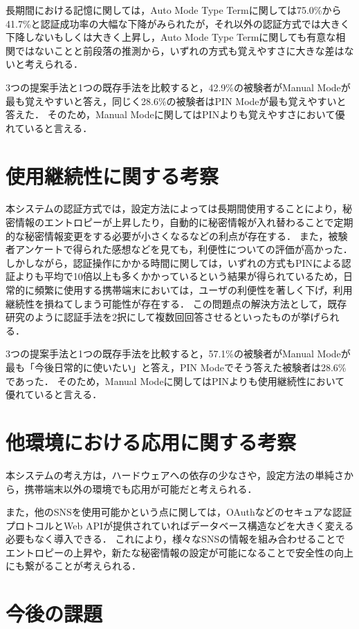 長期間における記憶に関しては，Auto Mode Type Termに関しては75.0\%から41.7\%と認証成功率の大幅な下降がみられたが，それ以外の認証方式では大きく下降しないもしくは大きく上昇し，Auto Mode Type Termに関しても有意な相関ではないことと前段落の推測から，いずれの方式も覚えやすさに大きな差はないと考えられる．

3つの提案手法と1つの既存手法を比較すると，42.9\%の被験者がManual Modeが最も覚えやすいと答え，同じく28.6\%の被験者はPIN Modeが最も覚えやすいと答えた．
そのため，Manual Modeに関してはPINよりも覚えやすさにおいて優れていると言える．

\section{使用継続性に関する考察}\label{sec:continuity}
本システムの認証方式では，設定方法によっては長期間使用することにより，秘密情報のエントロピーが上昇したり，自動的に秘密情報が入れ替わることで定期的な秘密情報変更をする必要が小さくなるなどの利点が存在する．
また，被験者アンケートで得られた感想などを見ても，利便性についての評価が高かった．
しかしながら，認証操作にかかる時間に関しては，いずれの方式もPINによる認証よりも平均で10倍以上も多くかかっているという結果が得られているため，日常的に頻繁に使用する携帯端末においては，ユーザの利便性を著しく下げ，利用継続性を損ねてしまう可能性が存在する．
この問題点の解決方法として，既存研究のように認証手法を2択にして複数回回答させるといったものが挙げられる．

3つの提案手法と1つの既存手法を比較すると，57.1\%の被験者がManual Modeが最も「今後日常的に使いたい」と答え，PIN Modeでそう答えた被験者は28.6\%であった．
そのため，Manual Modeに関してはPINよりも使用継続性において優れていると言える．

\section{他環境における応用に関する考察}\label{sec:application}
本システムの考え方は，ハードウェアへの依存の少なさや，設定方法の単純さから，携帯端末以外の環境でも応用が可能だと考えられる．

また，他のSNSを使用可能かという点に関しては，OAuthなどのセキュアな認証プロトコルとWeb APIが提供されていればデータベース構造などを大きく変える必要もなく導入できる．
これにより，様々なSNSの情報を組み合わせることでエントロピーの上昇や，新たな秘密情報の設定が可能になることで安全性の向上にも繋がることが考えられる．

\section{今後の課題}
